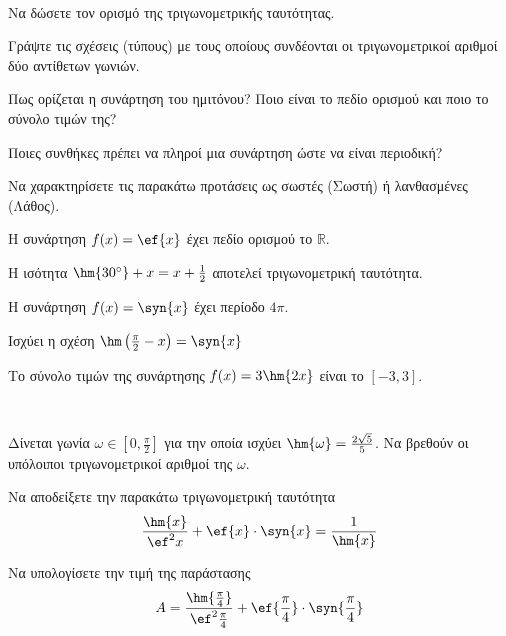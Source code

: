 \documentclass[11pt,a4paper]{article}
\begin{document}
\begin{thema}
\item \mbox{}\\\vspace{-5mm}
\begin{erwthma}
\item Να δώσετε τον ορισμό της τριγωνομετρικής ταυτότητας.
\item Γράψτε τις σχέσεις (τύπους) με τους οποίους συνδέονται οι τριγωνομετρικοί αριθμοί δύο αντίθετων γωνιών.
\item Πως ορίζεται η συνάρτηση του ημιτόνου? Ποιο είναι το πεδίο ορισμού και ποιο το σύνολο τιμών της?
\item Ποιες συνθήκες πρέπει να πληροί μια συνάρτηση ώστε να είναι περιοδική?
\item Να χαρακτηρίσετε τις παρακάτω προτάσεις ως σωστές (Σωστή) ή λανθασμένες (Λάθος).
\begin{alist}
\item Η συνάρτηση $ f(x)=\ef{x} $ έχει πεδίο ορισμού το $ \mathbb{R} $.
\item Η ισότητα $ \hm{30\degree}+x=x+\frac{1}{2} $ αποτελεί τριγωνομετρική ταυτότητα.
\item Η συνάρτηση $ f(x)=\syn{x} $ έχει περίοδο $ 4\pi $.
\item Ισχύει η σχέση $ \hm\left(\frac{\pi}{2}-x\right)=\syn{x} $
\item Το σύνολο τιμών της συνάρτησης $ f(x)=3\hm{2x} $ είναι το $ [-3,3] $.
\end{alist}
\end{erwthma}
\item\mbox{}\\\vspace{-5mm}
\begin{erwthma}
\item Δίνεται γωνία $ \omega\in[0,\frac{\pi}{2}] $ για την οποία ισχύει $ \hm{\omega}=\frac{2\sqrt{5}}{5} $. Να βρεθούν οι υπόλοιποι τριγωνομετρικοί αριθμοί της $ \omega $.
\item
\begin{alist}
\item Να αποδείξετε την παρακάτω τριγωνομετρική ταυτότητα
\[ \frac{\hm{x}}{\ef^2{x}}+\ef{x}\cdot\syn{x}=\dfrac{1}{\hm{x}} \]
\item Να υπολογίσετε την τιμή της παράστασης
\[ A=\frac{\hm{\frac{\pi}{4}}}{\ef^2{\frac{\pi}{4}}}+\ef{\frac{\pi}{4}}\cdot\syn{\frac{\pi}{4}} \]
\end{alist}
\end{erwthma}
\item\mbox{}\\\vspace{-5mm}

\end{thema}
\end{document}
